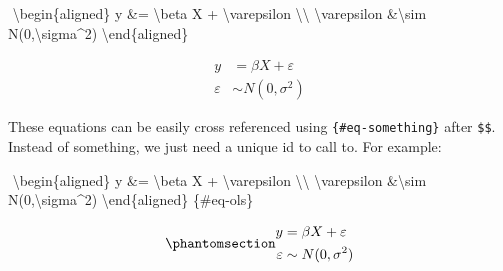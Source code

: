 \documentclass[
  11pts,
]{article}
\newenvironment{Shaded}{\begin{snugshade}}{\end{snugshade}}
\newcommand{\ExtensionTok}[1]{\textcolor[rgb]{0.00,0.23,0.31}{#1}}
\newcommand{\KeywordTok}[1]{\textcolor[rgb]{0.00,0.23,0.31}{#1}}
\newcommand{\NormalTok}[1]{\textcolor[rgb]{0.00,0.23,0.31}{#1}}
\newcommand{\SpecialCharTok}[1]{\textcolor[rgb]{0.37,0.37,0.37}{#1}}
\newcommand{\SpecialStringTok}[1]{\textcolor[rgb]{0.13,0.47,0.30}{#1}}
\begin{document}
\begin{Shaded}
\begin{Highlighting}[]
\SpecialStringTok{$$}
\KeywordTok{\textbackslash{}begin}\NormalTok{\{}\ExtensionTok{aligned}\NormalTok{\}}
\SpecialStringTok{y \&= }\SpecialCharTok{\textbackslash{}beta}\SpecialStringTok{ X + }\SpecialCharTok{\textbackslash{}varepsilon}\SpecialStringTok{ }\SpecialCharTok{\textbackslash{}\textbackslash{}}
\SpecialCharTok{\textbackslash{}varepsilon}\SpecialStringTok{ \&}\SpecialCharTok{\textbackslash{}sim}\SpecialStringTok{ N(0,}\SpecialCharTok{\textbackslash{}sigma}\SpecialStringTok{\^{}2)}
\KeywordTok{\textbackslash{}end}\NormalTok{\{}\ExtensionTok{aligned}\NormalTok{\}}
\SpecialStringTok{$$}
\end{Highlighting}
\end{Shaded}

\[
\begin{aligned}
y &= \beta X + \varepsilon \\
\varepsilon &\sim N(0,\sigma^2)
\end{aligned}
\]

These equations can be easily cross referenced using
\texttt{\{\#eq-something\}} after \texttt{\$\$}. Instead of something,
we just need a unique id to call to. For example:

\begin{Shaded}
\begin{Highlighting}[]
\SpecialStringTok{$$}
\KeywordTok{\textbackslash{}begin}\NormalTok{\{}\ExtensionTok{aligned}\NormalTok{\}}
\SpecialStringTok{y \&= }\SpecialCharTok{\textbackslash{}beta}\SpecialStringTok{ X + }\SpecialCharTok{\textbackslash{}varepsilon}\SpecialStringTok{ }\SpecialCharTok{\textbackslash{}\textbackslash{}}
\SpecialCharTok{\textbackslash{}varepsilon}\SpecialStringTok{ \&}\SpecialCharTok{\textbackslash{}sim}\SpecialStringTok{ N(0,}\SpecialCharTok{\textbackslash{}sigma}\SpecialStringTok{\^{}2)}
\KeywordTok{\textbackslash{}end}\NormalTok{\{}\ExtensionTok{aligned}\NormalTok{\}}
\SpecialStringTok{$$}\NormalTok{\{\#eq{-}ols\}}
\end{Highlighting}
\end{Shaded}

\begin{equation}\phantomsection\label{eq-ols}{
\begin{aligned}
y &= \beta X + \varepsilon \\
\varepsilon &\sim N(0,\sigma^2)
\end{aligned}
}\end{equation}
\end{document}
